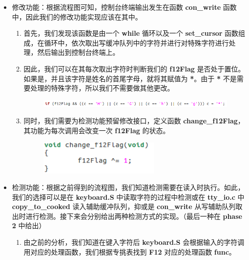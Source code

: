             \begin{itemize}
                \item 修改功能：根据流程图可知，控制台终端输出发生在函数 \textbf{con\_write} 函数中，因此我们的修改功能实现应该在其中。
                    \begin{enumerate}
                        \item 首先，我们发现该函数是由一个 \textbf{while} 循环以及一个 \textbf{set\_cursor} 函数组成，在循环中，依次取出写缓冲队列中的字符并进行对特殊字符进行处理，然后输出到控制台终端上。
                        \item 因此，我们可以在其每次取出字符时判断我们的 \textbf{f12Flag} 是否处于置位。如果是，并且该字符是姓名的首尾字母，就将其赋值为 \textbf{*}。由于 \textbf{*} 不是需要处理的特殊字符，所以我们不需要做其他更改。
                            \begin{figure}[htbp]
                                \hspace*{2.3cm}
                                \includegraphics*[width = 13cm]{s2_0.png}
                            \end{figure}
                        \item 同时，我们需要为检测功能预留修改接口，定义函数 \textbf{change\_f12Flag}，其功能为每次调用会改变一次 \textbf{f12Flag} 的状态。
                            \begin{figure}[htbp]
                                \hspace*{2.3cm}
                                \includegraphics*[width = 6cm]{s2_1.png}
                            \end{figure}
                    \end{enumerate}
                \item 检测功能：根据之前得到的流程图，我们知道检测需要在读入时执行。如此，我们的选择可以是在 \textbf{keyboard.S} 中读取字符的过程中检测或在 \textbf{tty\_io.c} 中 \textbf{copy\_to\_cooked} 读入辅助缓冲队列，抑或是 \textbf{con\_write} 从写辅助队列取出时进行检测。接下来会分别给出两种检测方式的实现。（最后一种在 \textbf{phase 2} 中给出）
                    \begin{enumerate}
                        \item 由之前的分析，我们知道在键入字符后 \textbf{keyboard.S} 会根据输入的字符调用对应的处理函数，我们根据专挑表找到 \textbf{F12} 对应的处理函数 \textbf{func}。

\end{enumerate}
\end{itemize}

